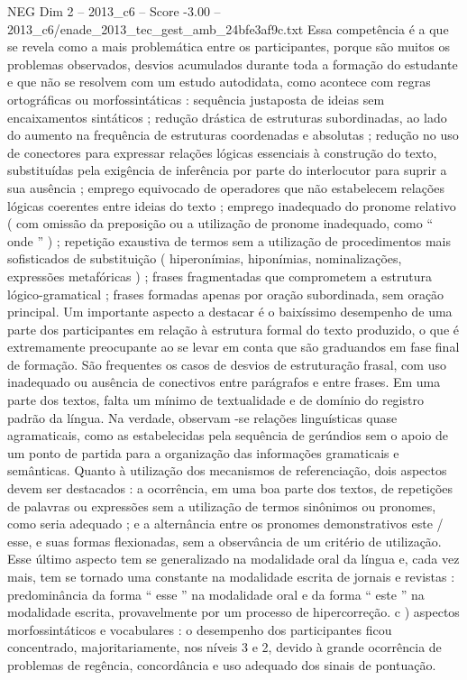 \begin{textsample}{NEG Dim 2 – 2013\_c6 – Score -3.00 – 2013\_c6/enade\_2013\_tec\_gest\_amb\_24bfe3af9c.txt}
Essa competência é a que se revela como a mais problemática entre os participantes, porque são muitos os problemas observados, desvios acumulados durante toda a formação do estudante e que não se resolvem com um estudo autodidata, como acontece com regras ortográficas ou morfossintáticas : sequência justaposta de ideias sem encaixamentos sintáticos ; redução drástica de estruturas subordinadas, ao lado do aumento na frequência de estruturas coordenadas e absolutas ; redução no uso de conectores para expressar relações lógicas essenciais à construção do texto, substituídas pela exigência de inferência por parte do interlocutor para suprir a sua ausência ; emprego equivocado de operadores que não estabelecem relações lógicas coerentes entre ideias do texto ; emprego inadequado do pronome relativo ( com omissão da preposição ou a utilização de pronome inadequado, como “ onde ” ) ; repetição exaustiva de termos sem a utilização de procedimentos mais sofisticados de substituição ( hiperonímias, hiponímias, nominalizações, expressões metafóricas ) ; frases fragmentadas que comprometem a estrutura lógico-gramatical ; frases formadas apenas por oração subordinada, sem oração principal.
Um importante aspecto a destacar é o baixíssimo desempenho de uma parte dos participantes em relação à estrutura formal do texto produzido, o que é extremamente preocupante ao se levar em conta que são graduandos em fase final de formação.
São frequentes os casos de desvios de estruturação frasal, com uso inadequado ou ausência de conectivos entre parágrafos e entre frases.
Em uma parte dos textos, falta um mínimo de textualidade e de domínio do registro padrão da língua.
Na verdade, observam -se relações linguísticas quase agramaticais, como as estabelecidas pela sequência de gerúndios sem o apoio de um ponto de partida para a organização das informações gramaticais e semânticas.
Quanto à utilização dos mecanismos de referenciação, dois aspectos devem ser destacados : a ocorrência, em uma boa parte dos textos, de repetições de palavras ou expressões sem a utilização de termos sinônimos ou pronomes, como seria adequado ; e a alternância entre os pronomes demonstrativos este / esse, e suas formas flexionadas, sem a observância de um critério de utilização.
Esse último aspecto tem se generalizado na modalidade oral da língua e, cada vez mais, tem se tornado uma constante na modalidade escrita de jornais e revistas : predominância da forma “ esse ” na modalidade oral e da forma “ este ” na modalidade escrita, provavelmente por um processo de hipercorreção. c ) aspectos morfossintáticos e vocabulares : o desempenho dos participantes ficou concentrado, majoritariamente, nos níveis 3 e 2, devido à grande ocorrência de problemas de regência, concordância e uso adequado dos sinais de pontuação.

\end{textsample}
